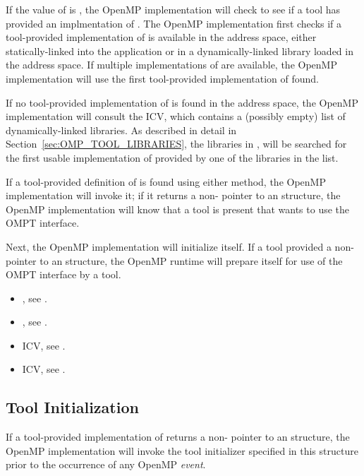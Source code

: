 If the value of  is , the OpenMP
implementation will check to see if a tool has provided an
implmentation of .  The OpenMP implementation first
checks if a tool-provided implementation of  is
available in the address space, either statically-linked into the
application or in a dynamically-linked library loaded in the address
space. If multiple implementations of  are available,
the OpenMP implementation will use the first tool-provided
implementation of  found.

If no tool-provided implementation of  is found in
the address space, the OpenMP implementation will consult the
 ICV, which contains a (possibly empty) list
of dynamically-linked libraries.  As described in detail in
Section~\ref{sec:OMP_TOOL_LIBRARIES}, the libraries in
, will be searched for the first usable
implementation of  provided by one of the libraries
in the list.

If a tool-provided definition of  is found using
either method, the OpenMP implementation will invoke it; if it returns
a non- pointer to an  structure, 
the OpenMP implementation will know
that a tool is present that wants to use the OMPT interface.

Next, the OpenMP implementation will initialize itself. If a tool
provided a non- pointer to an  structure,
the OpenMP runtime will prepare itself for use of the OMPT interface by a tool. 

\crossreferences
\begin{itemize}
\item {}, see .
\item {}, see .
\item {} ICV, see .
\item {} ICV, see .
\end{itemize}

\subsection{Tool Initialization}
\label{sec:tool-initialize}

If a tool-provided implementation of  returns a
non- pointer to an  structure,
the OpenMP implementation will invoke the tool initializer specified
in this structure prior to the occurrence of any OpenMP \emph{event}. 

